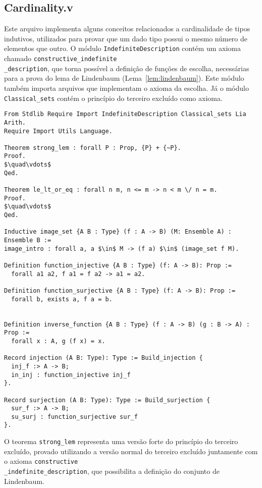     \subsection{Cardinality.v}\label{sec:cardinality}

        Este arquivo implementa alguns conceitos relacionados a cardinalidade de tipos indutivos, utilizados para provar que um dado tipo possui o mesmo número de elementos que outro. O módulo \texttt{IndefiniteDescription} contém um axioma chamado \texttt{constructive\_indefinite\\\_description}, que torna possível a definição de funções de escolha, necessárias para a prova do lema de Lindenbaum (Lema~\ref{lem:lindenbaum}). Este módulo também importa arquivos que implementam o axioma da escolha. Já o módulo \texttt{Classical\_sets} contém o princípio do terceiro excluído como axioma.

        \begin{lstlisting}[name=LFI, frame=single, language=coq]
From Stdlib Require Import IndefiniteDescription Classical_sets Lia Arith.
Require Import Utils Language.

Theorem strong_lem : forall P : Prop, {P} + {~P}.
Proof.
$\quad\vdots$
Qed. 

Theorem le_lt_or_eq : forall n m, n <= m -> n < m \/ n = m.
Proof.
$\quad\vdots$
Qed.

Inductive image_set {A B : Type} (f : A -> B) (M: Ensemble A) : Ensemble B :=
image_intro : forall a, a $\in$ M -> (f a) $\in$ (image_set f M).

Definition function_injective {A B : Type} (f: A -> B): Prop :=
  forall a1 a2, f a1 = f a2 -> a1 = a2.

Definition function_surjective {A B : Type} (f: A -> B): Prop :=
  forall b, exists a, f a = b.

  
Definition inverse_function {A B : Type} (f : A -> B) (g : B -> A) : Prop :=
  forall x : A, g (f x) = x.

Record injection (A B: Type): Type := Build_injection {
  inj_f :> A -> B;
  in_inj : function_injective inj_f
}.

Record surjection (A B: Type): Type := Build_surjection {
  sur_f :> A -> B;
  su_surj : function_surjective sur_f
}.
          \end{lstlisting}

          O teorema \texttt{strong\_lem} representa uma versão forte do princípio do terceiro excluído, provado utilizando a versão normal do terceiro excluído juntamente com o axioma \texttt{constructive\\\_indefinite\_description}, que possibilita a definição do conjunto de Lindenbaum.

